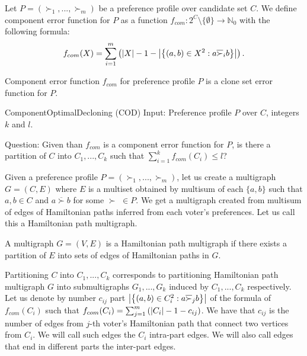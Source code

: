 \begin{defn}
Let $P = (\succ_1, ..., \succ_m)$ be a preference profile over candidate set $C$.
We define component error function for $P$ as
a function $f_{com}: 2^C \setminus \{\emptyset\} \rightarrow \mathbb{N}_0$ with the following formula:
$$ f_{com}(X) = \sum_{i=1}^m \left( \left\vert X \right\vert-1 -
\left\vert \left\lbrace \left( a,b \right) \in X^2 : a \overline{\succ}_i b \right\rbrace  \right\vert
\right) \text{.}$$
\end{defn}

\begin{rmrk}
Component error function $f_{com}$ for preference profile $P$ is a clone set error function for $P$.
\end{rmrk}

\begin{problem}{ComponentOptimalDecloning (COD)}
	Input: Preference profile $P$ over $C$, integers $k$ and $l$.

	Question: Given than $f_{com}$ is a component error function for $P$,
		is there a partition of $C$ into $C_1, ..., C_k$ such that $\sum_{i=1}^k f_{com}(C_i) \leq l$?
\end{problem}

Given a preference profile $P = (\succ_1, ..., \succ_m)$, let us create a multigraph $G=(C,E)$
where $E$ is a multiset obtained by multisum
of each $\{a,b\}$ such that $a,b \in C$ and $a \overline{\succ} b$ for some $\succ$ \xspace $ \in P$.
We get a multigraph created from multisum of edges of Hamiltonian paths inferred from each voter's preferences.
Let us call this a Hamiltonian path multigraph.

\begin{defn}
A multigraph $G=(V,E)$ is a Hamiltonian path multigraph if there exists a partition of $E$
into sets of edges of Hamiltonian paths in $G$.
\end{defn}

Partitioning $C$ into $C_1,...,C_k$ corresponds to
partitioning Hamiltonian path multigraph $G$ into submultigraphs $G_1,...,G_k$
induced by $C_1,...,C_k$ respectively.
Let us denote by number $c_{ij}$ part
$\left\vert \left\lbrace \left( a,b \right) \in C_i^2 : a \overline{\succ}_j b \right\rbrace  \right\vert$
of the formula of $f_{com}(C_i)$ such that
$f_{com}(C_i) = \sum_{j=1}^m \left( \left\vert C_i \right\vert - 1 - c_{ij} \right)$.
We have that $c_{ij}$ is the number of edges from $j$-th voter's Hamiltonian path
that connect two vertices from $C_i$.
We will call such edges the $C_i$ intra-part edges.
We will also call edges that end in different parts the inter-part edges.

